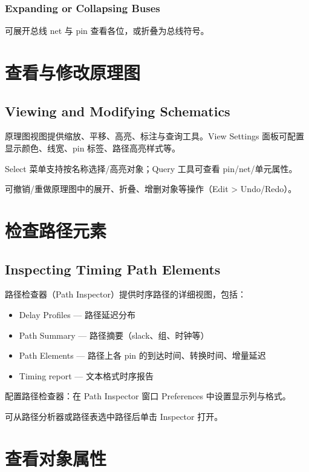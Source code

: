\subsubsection*{Expanding or Collapsing Buses}

可展开总线 net 与 pin 查看各位，或折叠为总线符号。

\section{查看与修改原理图}
\subsection*{Viewing and Modifying Schematics}

原理图视图提供缩放、平移、高亮、标注与查询工具。View Settings 面板可配置显示颜色、线宽、pin 标签、路径高亮样式等。

Select 菜单支持按名称选择/高亮对象；Query 工具可查看 pin/net/单元属性。

可撤销/重做原理图中的展开、折叠、增删对象等操作（Edit > Undo/Redo）。

\section{检查路径元素}
\subsection*{Inspecting Timing Path Elements}

路径检查器（Path Inspector）提供时序路径的详细视图，包括：
\begin{itemize}
  \item Delay Profiles — 路径延迟分布
  \item Path Summary — 路径摘要（slack、组、时钟等）
  \item Path Elements — 路径上各 pin 的到达时间、转换时间、增量延迟
  \item Timing report — 文本格式时序报告
\end{itemize}

配置路径检查器：在 Path Inspector 窗口 Preferences 中设置显示列与格式。

可从路径分析器或路径表选中路径后单击 Inspector 打开。


\section{查看对象属性}
